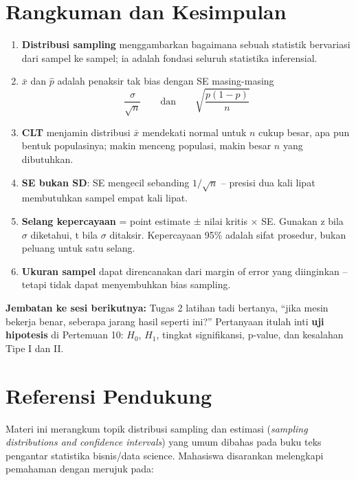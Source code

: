 \documentclass[
  indonesian,
  letterpaper,
]{book}
\providecommand{\tightlist}{%
  \setlength{\itemsep}{0pt}\setlength{\parskip}{0pt}}
\begin{document}
\section{Rangkuman dan Kesimpulan}\label{rangkuman-dan-kesimpulan}

\begin{enumerate}
\def\labelenumi{\arabic{enumi}.}
\tightlist
\item
  \textbf{Distribusi sampling} menggambarkan bagaimana sebuah statistik
  bervariasi dari sampel ke sampel; ia adalah fondasi seluruh statistika
  inferensial.
\item
  \(\bar{x}\) dan \(\hat{p}\) adalah penaksir tak bias dengan SE
  masing-masing
  \[\frac{\sigma}{\sqrt{n}} \qquad\text{dan}\qquad \sqrt{\frac{p(1-p)}{n}}\]
\item
  \textbf{CLT} menjamin distribusi \(\bar{x}\) mendekati normal untuk
  \(n\) cukup besar, apa pun bentuk populasinya; makin menceng populasi,
  makin besar \(n\) yang dibutuhkan.
\item
  \textbf{SE bukan SD}: SE mengecil sebanding \(1/\sqrt{n}\) -- presisi
  dua kali lipat membutuhkan sampel empat kali lipat.
\item
  \textbf{Selang kepercayaan} = point estimate ± nilai kritis × SE.
  Gunakan z bila \(\sigma\) diketahui, t bila \(\sigma\) ditaksir.
  Kepercayaan 95\% adalah sifat prosedur, bukan peluang untuk satu
  selang.
\item
  \textbf{Ukuran sampel} dapat direncanakan dari margin of error yang
  diinginkan -- tetapi tidak dapat menyembuhkan bias sampling.
\end{enumerate}

\textbf{Jembatan ke sesi berikutnya:} Tugas 2 latihan tadi bertanya,
``jika mesin bekerja benar, seberapa jarang hasil seperti ini?''
Pertanyaan itulah inti \textbf{uji hipotesis} di Pertemuan 10: \(H_0\),
\(H_1\), tingkat signifikansi, p-value, dan kesalahan Tipe I dan II.

\section{Referensi Pendukung}\label{referensi-pendukung}

Materi ini merangkum topik distribusi sampling dan estimasi
(\emph{sampling distributions and confidence intervals}) yang umum
dibahas pada buku teks pengantar statistika bisnis/data science.
Mahasiswa disarankan melengkapi pemahaman dengan merujuk pada:
\end{document}
